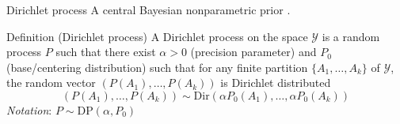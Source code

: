 \begin{frame}{Dirichlet process}
A central Bayesian nonparametric prior \citep{ferguson1973bayesian}.\pause

\begin{block}{Definition (Dirichlet process)}
A \alert{Dirichlet process} on the space $\mathcal{Y}$ is a random process $ P $ such that there exist $ \alpha>0 $ (precision parameter) and $ P_0 $ (base/centering distribution) \pause such that for any finite partition $ \{A_1,\ldots,A_k\} $ of $\mathcal{Y}$, the random vector
$ (P(A_1),\ldots,P(A_k)) $ is Dirichlet distributed
\[ (P(A_1),\ldots,P(A_k))\sim \text{Dir}(\alpha P_0(A_1),\ldots,\alpha P_0(A_k)) \]
\textit{Notation}: $ P \sim \text{DP}(\alpha, P_0) $
\end{block}
\begin{center}
\end{center}
\end{frame}


